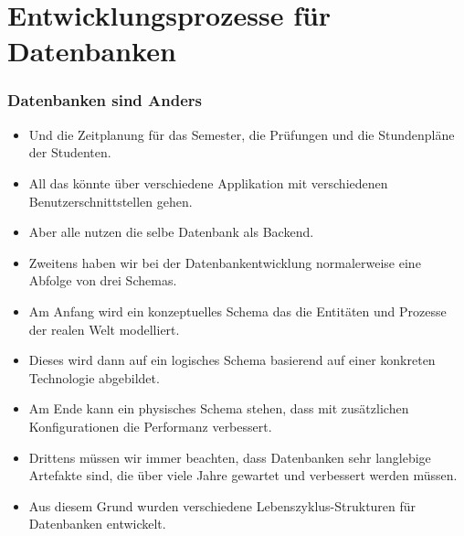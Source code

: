 \documentclass[aspectratio=169,mathserif,notheorems]{beamer}%
\begin{document}
\section{Entwicklungsprozesse für Datenbanken}%
%
\begin{frame}[t]%
\frametitle{Datenbanken sind Anders}%
\begin{itemize}%
%
%
%
%
%
%
%
%
%
%
\item<6-> Und die Zeitplanung für das Semester, die Prüfungen und die Stundenpläne der Studenten.%
%
\item<7-> All das könnte über verschiedene Applikation mit verschiedenen Benutzerschnittstellen gehen.%
%
\item<8-> Aber alle nutzen die selbe Datenbank als Backend.%
%
\item<9-> \alert{Zweitens} haben wir bei der Datenbankentwicklung normalerweise eine Abfolge von drei Schemas.%
%
\item<10-> Am Anfang wird ein konzeptuelles Schema das die Entitäten und Prozesse der realen Welt modelliert.%
%
\item<11-> Dieses wird dann auf ein logisches Schema basierend auf einer konkreten Technologie abgebildet.%
%
\item<12-> Am Ende kann ein physisches Schema stehen, dass mit zusätzlichen Konfigurationen die Performanz verbessert.%
%
\item<13-> \alert{Drittens} müssen wir immer beachten, dass Datenbanken sehr langlebige Artefakte sind, die über viele Jahre gewartet und verbessert werden müssen.%
%
\item<14-> Aus diesem Grund wurden verschiedene Lebenszyklus-Strukturen für Datenbanken entwickelt.%
\end{itemize}%
\end{frame}%
\end{document}

